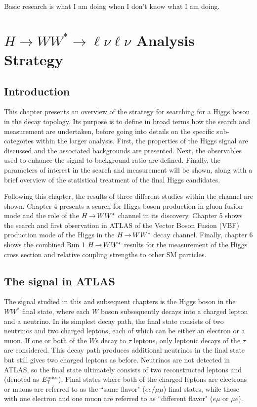 \begin{savequote}[75mm]
Basic research is what I am doing when I don't know what I am doing.
\end{savequote}

\chapter{$H\rightarrow WW^{*}\rightarrow \ell\nu\ell\nu$ Analysis Strategy}
\label{chap:hwwstrategy}

\section{Introduction}

This chapter presents an overview of the strategy for searching for a Higgs boson in the 
\HWWfull decay topology. Its purpose is to define in broad terms how the search and measurement are undertaken, before going into details on the specific sub-categories within the larger analysis. First, the properties of the Higgs signal are discussed and the associated backgrounds are
presented. Next, the observables used to enhance the signal to background ratio are defined. 
Finally, the parameters of interest in the search and measurement will be shown, 
along with a brief overview of the statistical treatment of the final Higgs candidates.


Following this chapter, the results of three different studies within the \HWWfull channel are shown. Chapter 4 presents a search for Higgs boson production in gluon fusion mode and the role of the $H{\,{\rightarrow}\,}WW^\ast$ channel in its discovery. Chapter 5 shows the search and first observation in ATLAS of the Vector Boson Fusion (VBF) production mode of the Higgs in the $H{\,{\rightarrow}\,}WW^\ast$ decay channel. Finally, chapter 6 shows the combined Run 1 $H{\,{\rightarrow}\,}WW^\ast$ results for the measurement of the Higgs cross section and relative coupling strengths to other SM particles. 

\section{The \HWWfull signal in ATLAS}

\label{sec:sigtopology}

The signal studied in this and subsequent chapters is the Higgs boson in the $WW^*$ final state,
where each $W$ boson subsequently decays into a charged lepton and a neutrino. In its simplest decay path, the final state consists of two neutrinos and two charged leptons, each of which can be either an electron or a muon. If one or both of the $W$s decay to $\tau$ leptons, only leptonic decays of the $\tau$ are considered. This decay path produces additional neutrinos in the final state but still gives two charged leptons as before. Neutrinos are not detected in ATLAS, so the final state ultimately consists of two reconstructed leptons and \met (denoted as $E_{\textrm{\footnotesize\sc t}}^{\rm miss}$). Final states where both of the charged leptons are electrons or muons are referred to as the ``same flavor" ($ee/\mu\mu$) final states, while those with one electron and one muon are referred to as ``different flavor" ($e\mu$ or $\mu e$).

